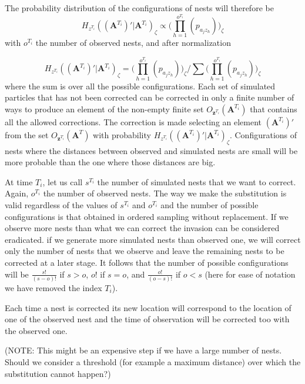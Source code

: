 \documentclass{article}
\renewcommand{\vec}[1]{\mathbf{#1}}
\begin{document}
The probability distribution of the configurations of nests will therefore be
\begin{equation*}
    H_{z^{T_i}}((\vec{A}^{T_i})' | \vec{A}^{T_i})_{\zeta} \propto \Bigg( \prod_{h = 1}^{o^{T_i}} (p_{a_j z_h}) \Bigg)_{\zeta}
\end{equation*}
with $o^{T_i}$ the number of observed nests, and after normalization 

\begin{equation*}
    H_{z^{T_i}}((\vec{A}^{T_i})' | \vec{A}^{T_i})_{\zeta} = \Bigg(\prod_{h = 1}^{o^{T_i}} (p_{a_j z_h}) \Bigg)_{\zeta} / \sum \Bigg(\prod_{h = 1}^{o^{T_i}} (p_{a_j z_h}) \Bigg)_{\zeta}
\end{equation*} 
where the sum is over all the possible configurations. Each set of simulated particles that has not been corrected can be corrected in only a finite number of ways to produce an element of the non-empty finite set $O_{\vec{z}^{T_i}} (\vec{A}^{T_i})$ that contains all the allowed corrections. The correction is made selecting an element $(\vec{A}^{T_i})'$ from the set $O_{\vec{z}^{T_i}} (\vec{A}^T)$ with probability $H_{z^{T_i}}((\vec{A}^{T_i})' | \vec{A}^{T_i})_{\zeta}$. Configurations of nests where the distances between observed and simulated nests are small will be more probable than the one where those distances are big.

At time $T_i$, let us call $s^{T_i}$ the number of simulated nests that we want to correct. Again, $o^{T_i}$ the number of observed nests. The way we make the substitution is valid regardless of the values of $s^{T_i}$ and $o^{T_i}$ and the number of possible configurations is that obtained in ordered sampling without replacement. If we observe more nests than what we can correct the invasion can be considered eradicated. if we generate more simulated nests than observed one, we will correct only the number of nests that we observe and leave the remaining nests to be corrected at a later stage.
It follows that the number of possible configurations will be $\frac{s!}{(s-o)!}$ if $s > o$, $o!$ if $s = o$, and $\frac{o!}{(o-s)!}$ if $o < s$ (here for ease of notation we have removed the index ${T_i}$).

Each time a nest is corrected its new location will correspond to the location of one of the observed nest and the time of observation will be corrected too with the observed one.

(NOTE: This might be an expensive step if we have a large number of nests. Should we consider a threshold (for example a maximum distance) over which the substitution cannot happen?)
\end{document}
